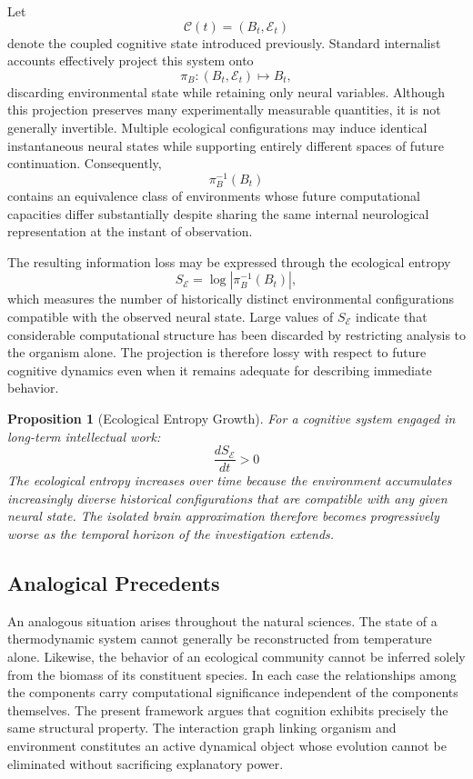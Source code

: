 \documentclass[12pt,oneside]{article}
\newtheorem{proposition}[definition]{Proposition}
\theoremstyle{remark}
\begin{document}
Let
\[
\mathcal{C}(t) = (B_t, \mathcal{E}_t)
\]
denote the coupled cognitive state introduced previously. Standard internalist accounts effectively project this system onto
\[
\pi_B : (B_t, \mathcal{E}_t) \longmapsto B_t,
\]
discarding environmental state while retaining only neural variables. Although this projection preserves many experimentally measurable quantities, it is not generally invertible. Multiple ecological configurations may induce identical instantaneous neural states while supporting entirely different spaces of future continuation. Consequently,
\[
\pi_B^{-1}(B_t)
\]
contains an equivalence class of environments whose future computational capacities differ substantially despite sharing the same internal neurological representation at the instant of observation.

The resulting information loss may be expressed through the ecological entropy
\[
S_{\mathcal{E}} = \log \left| \pi_B^{-1}(B_t) \right|,
\]
which measures the number of historically distinct environmental configurations compatible with the observed neural state. Large values of \(S_{\mathcal{E}}\) indicate that considerable computational structure has been discarded by restricting analysis to the organism alone. The projection is therefore lossy with respect to future cognitive dynamics even when it remains adequate for describing immediate behavior.

\begin{proposition}[Ecological Entropy Growth]
For a cognitive system engaged in long-term intellectual work:
\[
\frac{dS_{\mathcal{E}}}{dt} > 0
\]
The ecological entropy increases over time because the environment accumulates increasingly diverse historical configurations that are compatible with any given neural state. The isolated brain approximation therefore becomes progressively worse as the temporal horizon of the investigation extends.
\end{proposition}

\subsection{Analogical Precedents}

An analogous situation arises throughout the natural sciences. The state of a thermodynamic system cannot generally be reconstructed from temperature alone. Likewise, the behavior of an ecological community cannot be inferred solely from the biomass of its constituent species. In each case the relationships among the components carry computational significance independent of the components themselves. The present framework argues that cognition exhibits precisely the same structural property. The interaction graph linking organism and environment constitutes an active dynamical object whose evolution cannot be eliminated without sacrificing explanatory power.
\end{document}
